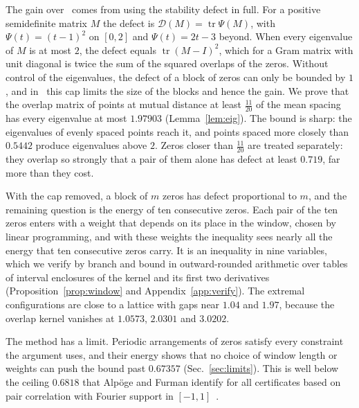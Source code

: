 \documentclass[aps,prd,twocolumn,superscriptaddress,nofootinbib,longbibliography,floatfix,showkeys,amsmath,amssymb,10pt]{revtex4-2}
\theoremstyle{definition}
\theoremstyle{remark}
\newcommand{\cD}{\mathcal{D}}
\DeclareMathOperator{\tr}{tr}
\begin{document}
The gain over~\cite{Ain26} comes from using the stability defect in full.
For a positive semidefinite matrix $M$ the defect is
$\cD(M)=\tr\Psi(M)$, with $\Psi(t)=(t-1)^2$ on $[0,2]$ and $\Psi(t)=2t-3$
beyond. When every eigenvalue of $M$ is at most $2$, the defect equals
$\tr(M-I)^2$, which for a Gram matrix with unit diagonal is twice the sum of
the squared overlaps of the zeros. Without control of the eigenvalues, the
defect of a block of zeros can only be bounded by $1$, and
in~\cite{Ain26} this cap limits the size of the blocks and hence the gain.
We prove that the overlap matrix of points at mutual distance at least
$\frac{11}{20}$ of the mean spacing has every eigenvalue at most
$1.97903$ (Lemma~\ref{lem:eig}). The bound is sharp: the eigenvalues of
evenly spaced points reach it, and points spaced more closely than
$0.5442$ produce eigenvalues above $2$. Zeros closer than $\frac{11}{20}$
are treated separately: they overlap so strongly that a pair of them alone
has defect at least $0.719$, far more than they cost.

With the cap removed, a block of $m$ zeros has defect proportional to $m$,
and the remaining question is the energy of ten consecutive zeros. Each
pair of the ten zeros enters with a weight that depends on its place in
the window, chosen by linear programming, and with these weights the
inequality sees nearly all the energy that ten consecutive zeros carry.
It is an inequality in nine variables, which we verify by branch and bound in
outward-rounded arithmetic over tables of interval enclosures of the
kernel and its first two derivatives (Proposition~\ref{prop:window} and
Appendix~\ref{app:verify}). The
extremal configurations are close to a lattice with gaps near $1.04$ and
$1.97$, because the overlap kernel vanishes at $1.0573$, $2.0301$ and
$3.0202$.

The method has a limit. Periodic arrangements of zeros satisfy every
constraint the argument uses, and their energy shows that no choice of
window length or weights can push the bound past $0.67357$ (Sec.~\ref{sec:limits}). This
is well below the ceiling $0.6818$ that Alp\"oge and Furman identify for all
certificates based on pair correlation with Fourier support in
$[-1,1]$~\cite[\S7.2]{AF26}.
\end{document}
